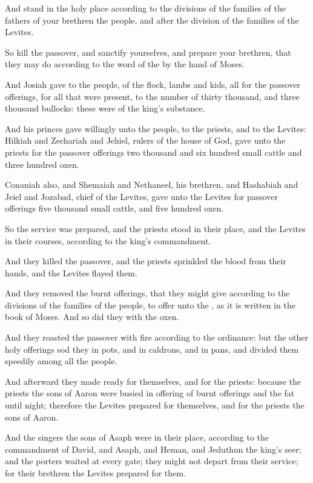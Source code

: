 \Verse And stand in the holy place according to the divisions of the families of the fathers of your brethren the people, and after the division of the families of the Levites.

\Verse So kill the passover, and sanctify yourselves, and prepare your brethren, that they may do according to the word of the \LORD by the hand of Moses.

\Verse And Josiah gave to the people, of the flock, lambs and kids, all for the passover offerings, for all that were present, to the number of thirty thousand, and three thousand bullocks: these were of the king's substance.

\Verse And his princes gave willingly unto the people, to the priests, and to the Levites: Hilkiah and Zechariah and Jehiel, rulers of the house of God, gave unto the priests for the passover offerings two thousand and six hundred small cattle and three hundred oxen.

\Verse Conaniah also, and Shemaiah and Nethaneel, his brethren, and Hashabiah and Jeiel and Jozabad, chief of the Levites, gave unto the Levites for passover offerings five thousand small cattle, and five hundred oxen.

\Verse So the service was prepared, and the priests stood in their place, and the Levites in their courses, according to the king's commandment.

\Verse And they killed the passover, and the priests sprinkled the blood from their hands, and the Levites flayed them.

\Verse And they removed the burnt offerings, that they might give according to the divisions of the families of the people, to offer unto the \LORD, as it is written in the book of Moses. And so did they with the oxen.

\Verse And they roasted the passover with fire according to the ordinance: but the other holy offerings sod they in pots, and in caldrons, and in pans, and divided them speedily among all the people.

\Verse And afterward they made ready for themselves, and for the priests: because the priests the sons of Aaron were busied in offering of burnt offerings and the fat until night; therefore the Levites prepared for themselves, and for the priests the sons of Aaron.

\Verse And the singers the sons of Asaph were in their place, according to the commandment of David, and Asaph, and Heman, and Jeduthun the king's seer; and the porters waited at every gate; they might not depart from their service; for their brethren the Levites prepared for them.

